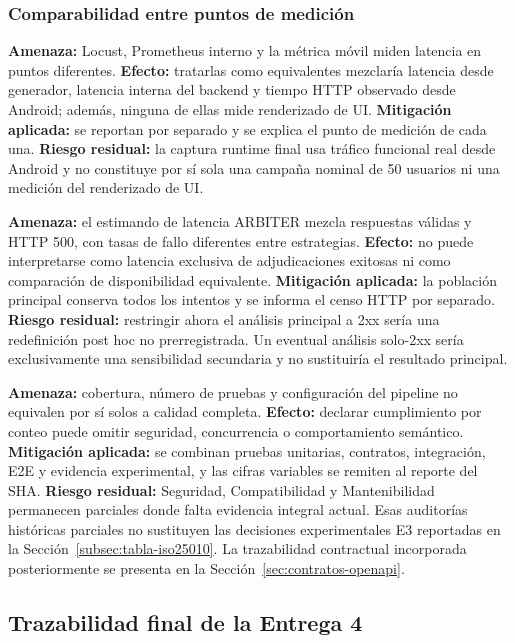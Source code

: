 \subsubsection{Comparabilidad entre puntos de medición}

\textbf{Amenaza:} Locust, Prometheus interno y la métrica móvil miden latencia
en puntos diferentes. \textbf{Efecto:} tratarlas como equivalentes mezclaría
latencia desde generador, latencia interna del backend y tiempo HTTP observado
desde Android; además, ninguna de ellas mide renderizado de UI.
\textbf{Mitigación aplicada:} se reportan por separado y se explica el punto de
medición de cada una. \textbf{Riesgo residual:} la captura runtime final usa tráfico funcional real desde Android y no constituye por sí sola una campaña nominal de 50 usuarios ni una medición del renderizado de UI.

\textbf{Amenaza:} el estimando de latencia ARBITER mezcla respuestas válidas y
HTTP 500, con tasas de fallo diferentes entre estrategias. \textbf{Efecto:} no
puede interpretarse como latencia exclusiva de adjudicaciones exitosas ni como
comparación de disponibilidad equivalente. \textbf{Mitigación aplicada:} la
población principal conserva todos los intentos y se informa el censo HTTP por
separado. \textbf{Riesgo residual:} restringir ahora el análisis principal a
2xx sería una redefinición post hoc no prerregistrada. Un eventual análisis
solo-2xx sería exclusivamente una sensibilidad secundaria y no sustituiría el
resultado principal.

\textbf{Amenaza:} cobertura, número de pruebas y configuración del pipeline no
equivalen por sí solos a calidad completa. \textbf{Efecto:} declarar
cumplimiento por conteo puede omitir seguridad, concurrencia o comportamiento
semántico. \textbf{Mitigación aplicada:} se combinan pruebas unitarias,
contratos, integración, E2E y evidencia experimental, y las cifras variables se
remiten al reporte del SHA. \textbf{Riesgo residual:} Seguridad,
Compatibilidad y Mantenibilidad permanecen parciales donde falta evidencia
integral actual. Esas auditorías históricas parciales no sustituyen las
decisiones experimentales E3 reportadas en la
Sección~\ref{subsec:tabla-iso25010}. La trazabilidad contractual incorporada
posteriormente se presenta en la Sección~\ref{sec:contratos-openapi}.

\subsection{Trazabilidad final de la Entrega 4}
\label{subsec:trazabilidad-final}

